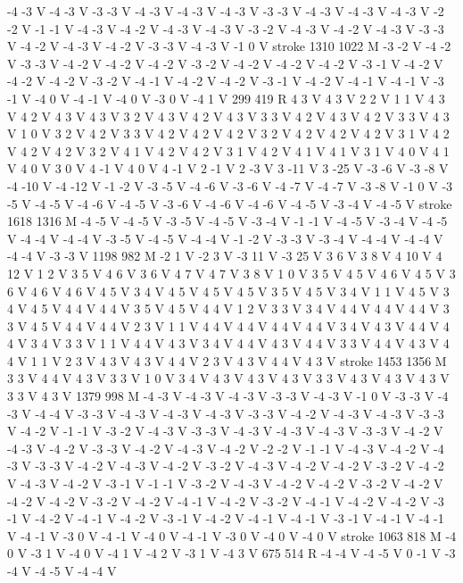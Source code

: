{{-4 -3 V
-4 -3 V
-3 -3 V
-4 -3 V
-4 -3 V
-4 -3 V
-3 -3 V
-4 -3 V
-4 -3 V
-4 -3 V
-2 -2 V
-1 -1 V
-4 -3 V
-4 -2 V
-4 -3 V
-4 -3 V
-3 -2 V
-4 -3 V
-4 -2 V
-4 -3 V
-3 -3 V
-4 -2 V
-4 -3 V
-4 -2 V
-3 -3 V
-4 -3 V
-1 0 V
stroke
1310 1022 M
-3 -2 V
-4 -2 V
-3 -3 V
-4 -2 V
-4 -2 V
-4 -2 V
-3 -2 V
-4 -2 V
-4 -2 V
-4 -2 V
-3 -1 V
-4 -2 V
-4 -2 V
-4 -2 V
-3 -2 V
-4 -1 V
-4 -2 V
-4 -2 V
-3 -1 V
-4 -2 V
-4 -1 V
-4 -1 V
-3 -1 V
-4 0 V
-4 -1 V
-4 0 V
-3 0 V
-4 1 V
299 419 R
4 3 V
4 3 V
2 2 V
1 1 V
4 3 V
4 2 V
4 3 V
4 3 V
3 2 V
4 3 V
4 2 V
4 3 V
3 3 V
4 2 V
4 3 V
4 2 V
3 3 V
4 3 V
1 0 V
3 2 V
4 2 V
3 3 V
4 2 V
4 2 V
4 2 V
3 2 V
4 2 V
4 2 V
4 2 V
3 1 V
4 2 V
4 2 V
4 2 V
3 2 V
4 1 V
4 2 V
4 2 V
3 1 V
4 2 V
4 1 V
4 1 V
3 1 V
4 0 V
4 1 V
4 0 V
3 0 V
4 -1 V
4 0 V
4 -1 V
2 -1 V
2 -3 V
3 -11 V
3 -25 V
-3 -6 V
-3 -8 V
-4 -10 V
-4 -12 V
-1 -2 V
-3 -5 V
-4 -6 V
-3 -6 V
-4 -7 V
-4 -7 V
-3 -8 V
-1 0 V
-3 -5 V
-4 -5 V
-4 -6 V
-4 -5 V
-3 -6 V
-4 -6 V
-4 -6 V
-4 -5 V
-3 -4 V
-4 -5 V
stroke
1618 1316 M
-4 -5 V
-4 -5 V
-3 -5 V
-4 -5 V
-3 -4 V
-1 -1 V
-4 -5 V
-3 -4 V
-4 -5 V
-4 -4 V
-4 -4 V
-3 -5 V
-4 -5 V
-4 -4 V
-1 -2 V
-3 -3 V
-3 -4 V
-4 -4 V
-4 -4 V
-4 -4 V
-3 -3 V
1198 982 M
-2 1 V
-2 3 V
-3 11 V
-3 25 V
3 6 V
3 8 V
4 10 V
4 12 V
1 2 V
3 5 V
4 6 V
3 6 V
4 7 V
4 7 V
3 8 V
1 0 V
3 5 V
4 5 V
4 6 V
4 5 V
3 6 V
4 6 V
4 6 V
4 5 V
3 4 V
4 5 V
4 5 V
4 5 V
3 5 V
4 5 V
3 4 V
1 1 V
4 5 V
3 4 V
4 5 V
4 4 V
4 4 V
3 5 V
4 5 V
4 4 V
1 2 V
3 3 V
3 4 V
4 4 V
4 4 V
4 4 V
3 3 V
4 5 V
4 4 V
4 4 V
2 3 V
1 1 V
4 4 V
4 4 V
4 4 V
4 4 V
3 4 V
4 3 V
4 4 V
4 4 V
3 4 V
3 3 V
1 1 V
4 4 V
4 3 V
3 4 V
4 4 V
4 3 V
4 4 V
3 3 V
4 4 V
4 3 V
4 4 V
1 1 V
2 3 V
4 3 V
4 3 V
4 4 V
2 3 V
4 3 V
4 4 V
4 3 V
stroke
1453 1356 M
3 3 V
4 4 V
4 3 V
3 3 V
1 0 V
3 4 V
4 3 V
4 3 V
4 3 V
3 3 V
4 3 V
4 3 V
4 3 V
3 3 V
4 3 V
1379 998 M
-4 -3 V
-4 -3 V
-4 -3 V
-3 -3 V
-4 -3 V
-1 0 V
-3 -3 V
-4 -3 V
-4 -4 V
-3 -3 V
-4 -3 V
-4 -3 V
-4 -3 V
-3 -3 V
-4 -2 V
-4 -3 V
-4 -3 V
-3 -3 V
-4 -2 V
-1 -1 V
-3 -2 V
-4 -3 V
-3 -3 V
-4 -3 V
-4 -3 V
-4 -3 V
-3 -3 V
-4 -2 V
-4 -3 V
-4 -2 V
-3 -3 V
-4 -2 V
-4 -3 V
-4 -2 V
-2 -2 V
-1 -1 V
-4 -3 V
-4 -2 V
-4 -3 V
-3 -3 V
-4 -2 V
-4 -3 V
-4 -2 V
-3 -2 V
-4 -3 V
-4 -2 V
-4 -2 V
-3 -2 V
-4 -2 V
-4 -3 V
-4 -2 V
-3 -1 V
-1 -1 V
-3 -2 V
-4 -3 V
-4 -2 V
-4 -2 V
-3 -2 V
-4 -2 V
-4 -2 V
-4 -2 V
-3 -2 V
-4 -2 V
-4 -1 V
-4 -2 V
-3 -2 V
-4 -1 V
-4 -2 V
-4 -2 V
-3 -1 V
-4 -2 V
-4 -1 V
-4 -2 V
-3 -1 V
-4 -2 V
-4 -1 V
-4 -1 V
-3 -1 V
-4 -1 V
-4 -1 V
-4 -1 V
-3 0 V
-4 -1 V
-4 0 V
-4 -1 V
-3 0 V
-4 0 V
-4 0 V
stroke
1063 818 M
-4 0 V
-3 1 V
-4 0 V
-4 1 V
-4 2 V
-3 1 V
-4 3 V
675 514 R
-4 -4 V
-4 -5 V
0 -1 V
-3 -4 V
-4 -5 V
-4 -4 V
}}
